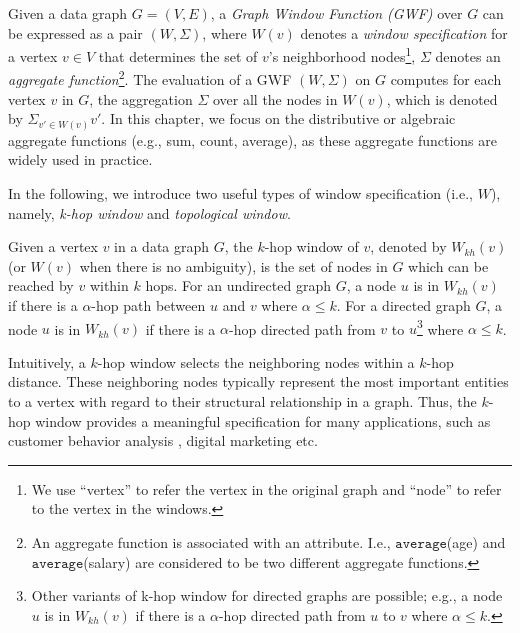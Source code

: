 Given a data graph $G = (V,E)$,
a \emph{Graph Window Function (GWF)} over $G$ can be expressed 
as a pair $(W, \Sigma)$, where 
$W(v)$ denotes a \emph{window specification} for a vertex $v \in V$ 
that determines the set of $v$'s neighborhood nodes\footnote{We use ``vertex'' to refer the vertex in the original graph and ``node'' to refer to the vertex in the windows.},
$\Sigma$ denotes an \emph{aggregate function}\footnote{An aggregate function is associated with an attribute. I.e., $\mathtt{average}$(age) and $\mathtt{average}$(salary) are considered to be two different aggregate functions.}.
The evaluation of a GWF $(W, \Sigma)$ on $G$
computes for each vertex $v$ in $G$, the aggregation $\Sigma$ 
over all the nodes in $W(v)$, which is denoted by $\Sigma_{v' \in W(v)} v'$.
%
In this chapter, we focus on the distributive or algebraic aggregate functions (e.g., sum, count, average), as these aggregate functions are widely used in practice. 
 
In the following, we introduce two useful types of window specification (i.e., $W$), namely, 
\emph{k-hop window} and \emph{topological window}.


\begin{definition} 
Given a vertex $v$ in a data graph $G$, 
the $k$-hop window of $v$, denoted by $W_{kh}(v)$ (or $W(v)$ when there is no ambiguity),
is the set of nodes in $G$ which can be reached by $v$ within $k$ hops.
For an undirected graph $G$,
a node $u$ is in $W_{kh}(v)$  if there is a $\alpha$-hop path between $u$ and $v$ where $\alpha \leqslant k$.
For a directed graph $G$,
a node $u$ is in $W_{kh}(v)$  if there is a $\alpha$-hop directed path from $v$ to $u$\footnote{
Other variants of k-hop window for directed graphs are possible; e.g.,
a node $u$ is in $W_{kh}(v)$  if there is a $\alpha$-hop directed path from $u$ to $v$ where $\alpha \leqslant k$.
} where $\alpha \leqslant k$.
\end{definition}

Intuitively, a $k$-hop window selects the neighboring nodes within a $k$-hop distance. 
These neighboring nodes typically represent the most important 
entities to a vertex with regard to their structural relationship in a graph. 
Thus, the $k$-hop window provides a meaningful specification for many applications, such as customer behavior analysis \cite{briscoe2013determining,dai2012predicting} , digital marketing \cite{ma2010ego} etc.

